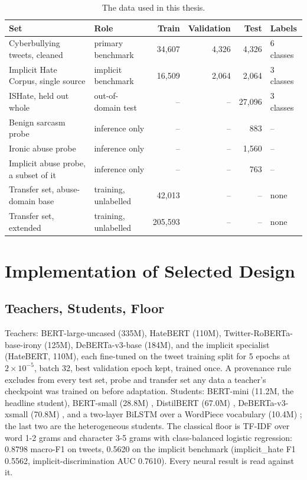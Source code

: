 \begin{table}[htbp]
\centering
\small
\caption{The data used in this thesis.}
\label{tab:data}
\begin{tabular}{p{5.4cm}p{2.6cm}rrrp{1.5cm}}
\toprule
Set & Role & Train & Validation & Test & Labels \\
\midrule
Cyberbullying tweets, cleaned \cite{wang2020sosnet} & primary benchmark & 34,607 & 4,326 & 4,326 & 6 classes \\
Implicit Hate Corpus, single source \cite{elsherief2021latent} & implicit benchmark & 16,509 & 2,064 & 2,064 & 3 classes \\
ISHate, held out whole \cite{ocampo2023indepth} & out-of-domain test & -- & -- & 27,096 & 3 classes \\
Benign sarcasm probe \cite{abufarha2022semeval, oprea2020isarcasm} & inference only & -- & -- & 883 & -- \\
Ironic abuse probe \cite{elsherief2021latent, ocampo2023indepth} & inference only & -- & -- & 1,560 & -- \\
Implicit abuse probe, a subset of it \cite{ocampo2023indepth} & inference only & -- & -- & 763 & -- \\
Transfer set, abuse-domain base \cite{davidson2017automated, zampieri2019olid, basile2019hateval} & training, unlabelled & 42,013 & -- & -- & none \\
Transfer set, extended \cite{barbieri2020tweeteval} & training, unlabelled & 205,593 & -- & -- & none \\
\bottomrule
\end{tabular}
\end{table}

\section{Implementation of Selected Design}
\label{sec:4.impl}
\subsection{Teachers, Students, Floor}
\label{sec:4.5}
Teachers: BERT-large-uncased (335M), HateBERT (110M), Twitter-RoBERTa-base-irony (125M),
DeBERTa-v3-base (184M), and the implicit specialist (HateBERT, 110M), each fine-tuned on the tweet
training split for 5 epochs at $2 \times 10^{-5}$, batch 32, best validation epoch kept, trained
once. A provenance rule excludes from every test set, probe and transfer set any data a teacher's
checkpoint was trained on before adaptation. Students: BERT-mini (11.2M, the headline student),
BERT-small (28.8M) \cite{turc2019wellread}, DistilBERT (67.0M) \cite{sanh2019distilbert},
DeBERTa-v3-xsmall (70.8M) \cite{he2023debertav3}, and a two-layer BiLSTM over a WordPiece vocabulary
(10.4M) \cite{tang2019distilling}; the last two are the heterogeneous students. The classical floor
is TF-IDF over word 1-2 grams and character 3-5 grams with class-balanced logistic regression:
0.8798 macro-F1 on tweets, 0.5620 on the implicit benchmark (implicit\_hate F1 0.5562,
implicit-discrimination AUC 0.7610). Every neural result is read against it.
